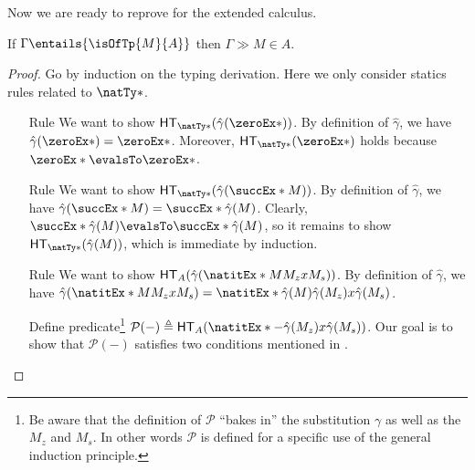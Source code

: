\documentclass[letterpaper]{article}
\begin{document}
Now we are ready to reprove  for the extended calculus.

\begin{theorem}\label{thm:fundamental-nat}
If $\Gamma \entails{\isOfTp{M}{A}}$ then $\Gamma \gg M \in A$.
\end{theorem}
\begin{proof}
Go by induction on the typing derivation. Here we only consider statics rules related to $\natTy*$.
\begin{enumerate}
  \item [Rule \ruleref{sta:zero}] We want to show $\HT[\natTy*](\hat{\gamma}(\zeroEx*))$. By definition of $\hat{\gamma}$, we have $\hat{\gamma}(\zeroEx*) = \zeroEx*$. Moreover, $\HT[\natTy*](\zeroEx*)$ holds because $\zeroEx* \evalsTo \zeroEx*$.
  \item [Rule \ruleref{sta:succ}] We want to show $\HT[\natTy*](\hat{\gamma}(\succEx*{M}))$. By definition of $\hat{\gamma}$, we have $\hat{\gamma}(\succEx*{M}) = \succEx*{\hat{\gamma}(M)}$. Clearly, $\succEx*{\hat{\gamma}(M)} \evalsTo \succEx*{\hat{\gamma}(M)}$, so it remains to show $\HT[\natTy*](\hat{\gamma}(M))$, which is immediate by induction.
  \item [Rule \ruleref{sta:natit}] We want to show $\HT[A](\hat{\gamma}(\natitEx*{M}{M_z}{x}{M_s}))$. By definition of $\hat{\gamma}$, we have $\hat{\gamma}(\natitEx*{M}{M_z}{x}{M_s}) = \natitEx*{\hat{\gamma}(M)}{\hat{\gamma}(M_z)}{x}{\hat{\gamma}(M_s)}$.

  Define predicate\footnote{Be aware that the definition of $\mathcal{P}$ ``bakes in'' the substitution $\gamma$ as well as the $M_z$ and $M_s$.
  In other words $\mathcal{P}$ is defined for a specific use of the general induction principle.} $\mathcal{P}(-) \triangleq \HT[A](\natitEx*{-}{\hat{\gamma}(M_z)}{x}{\hat{\gamma}(M_s)})$. Our goal is to show that $\mathcal{P}(-)$ satisfies two conditions mentioned in .


\end{enumerate}
\end{proof}
\end{document}
